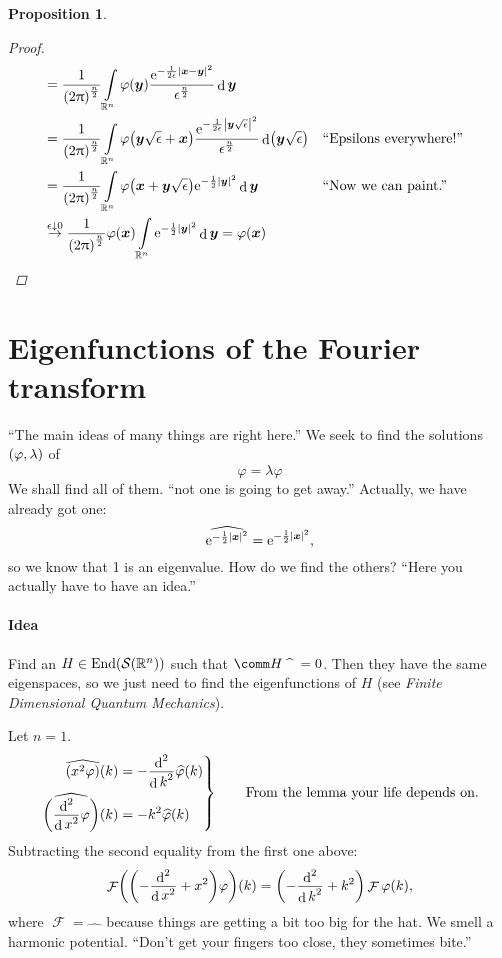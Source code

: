 \documentclass[10pt]{article}
\newtheorem*{proposition}{Proposition}
\DeclarePairedDelimiter\abs{\lvert}{\rvert}
\DeclarePairedDelimiter\of{\lparen}{\rparen}
\newcommand{\R}{\mathbb{R}}
\newcommand{\Rn}{{\R^n}}
\newcommand{\Schwartz}{{\mathcal{S}\of*{\R^n}}}
\DeclareMathOperator{\diffd}{d}
\DeclareMathOperator{\FT}{\mathcal{F}}
\DeclareMathOperator{\End}{End}
\newcommand\gl\lambda
\newcommand\gj\varphi
\renewcommand{\ge}{\epsilon}
\newcommand{\bx}{{\vectorsym x}}
\newcommand{\by}{{\vectorsym y}}
\newcommand\ft\widehat
\newcommand\Int[1]{\int\limits_#1}
\newcommand\nthderiv[3][]{\frac{\diffd^#3 #1}{{\diffd #2}^#3}}
\newcommand\E{\mathrm{e}}
\newcommand{\ftnrm}{\frac{1}{\of*{2\pi}^\frac{n}{2}} }
\begin{document}
\begin{proposition}
\begin{proof}
\begin{align*}
        &=\ftnrm\Int\Rn\gj\of*\by\frac{\E^{-\frac{1}{2\ge}\abs*{\bx-\by}^2}}
        {\ge^\frac{n}{2}}\diffd\by \\
        &=\ftnrm\Int\Rn\gj\of*{\by\sqrt\ge+\bx}\frac{\E^{-\frac{1}{2\ge}\abs*{\by\sqrt\ge}^2}}
        {\ge^\frac{n}{2}}\diffd\of*{\by\sqrt\ge} && \text{``Epsilons everywhere!''}\\    
        &=\ftnrm\Int\Rn\gj\of*{\bx+\by\sqrt\ge}\E^{-\frac{1}{2}\abs*\by^2}\diffd\by
        && \text{``Now we can paint.''}\\
        &\overset{\ge\downarrow 0}{\rightarrow}
        \ftnrm\gj\of*\bx\Int\Rn\E^{-\frac{1}{2}\abs*\by^2}\diffd\by =\gj\of*\bx
      \end{align*}
    \end{proof}
  \end{proposition}
  \section{Eigenfunctions of the Fourier transform}
  ``The main ideas of many things are right here.''
  We seek to find the solutions $\of*{\gj,\gl}$ of
  \begin{equation*}
    \ft\gj=\gl\gj
  \end{equation*}
  We shall find all of them. ``not one is going to get away.'' Actually, we have already got one:
  \begin{equation*}
    \ft{\E^{-\frac{1}{2}\abs*\bx^2}}=\E^{-\frac{1}{2}\abs*\bx^2},
  \end{equation*}
  so we know that 1 is an eigenvalue. How do we find the others? ``Here you actually have to have an idea.''
  
  \paragraph{Idea}
  Find an $H\in\End\of*\Schwartz$ such that $\comm H {\ft\quad} = 0$. Then they have the same eigenspaces, so we just need to find the eigenfunctions of $H$ (see \emph{Finite Dimensional Quantum Mechanics}).
  
  Let $n=1$.
  \begin{equation*}
    \left.
    \begin{aligned}
      \ft{\of*{x^2\gj}}\of* k &= -\nthderiv{k}{2}\ft\gj\of* k \\
      \ft{\of*{\nthderiv{x}{2}\gj}}\of* k &= -k^2 \ft\gj\of* k
    \end{aligned}
    \right\rbrace \qquad \text{From the lemma your life depends on.}
  \end{equation*}
  Subtracting the second equality from the first one above:
  \begin{equation*}
    \FT\of*{\of*{-\nthderiv{x}{2}+x^2}\gj}\of* k = \of*{-\nthderiv{k}{2}+k^2}\FT\gj\of* k,
  \end{equation*}
  where $\FT = \ft\quad$ because things are getting a bit too big for the hat.
  We smell a harmonic potential. ``Don't get your fingers too close, they sometimes bite.''
  
\end{document}

